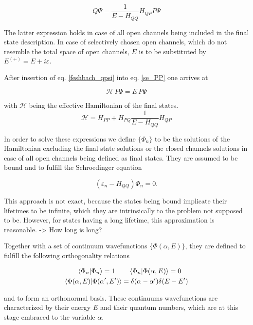 \begin{equation}
  Q \Psi = \frac{1}{E-H_{QQ}} H_{QP} P \Psi \label{feshbach_qpsi}
\end{equation}

The latter expression holds in case of all open channels being included
in the final state description.
In case of selectively chosen open channels, which do not resemble the total
space of open channels,
$E$ is to be substituted by $E^{(+)}=E + i\varepsilon$.

After insertion of eq. \ref{feshbach_qpsi} into eq. \ref{se_PP} one arrives at

\begin{equation}
  \mathscr{H} \,P \Psi = E \,P \Psi \label{se_ppsi}
\end{equation}

with $\mathscr{H}$ being the effective Hamiltonian of the final states.
\begin{equation}
  \mathscr{H} = H_{PP} + H_{PQ} \frac{1}{E-H_{QQ}} H_{QP}
\end{equation}

In order to solve these expressions we define $\{\Phi_n\}$ to be the solutions
of the Hamiltonian excluding the final state solutions or the closed channels
solutions in case of all open channels being defined as final states.
They are assumed to be bound and to fulfill the
Schroedinger equation

\begin{equation}
  (\varepsilon_n - H_{QQ}) \Phi_n = 0 .
\end{equation}

This approach is not exact, because the states being bound implicate
their lifetimes to be infinite, which they are intrinsically
to the problem not supposed to be. However, for states having a long lifetime,
this approximation is reasonable. -> How long is long?

Together with a set of continuum wavefunctions $\{\Phi(\alpha,E)\}$, they are
defined to fulfill the following orthogonality relations

\begin{align}
  \braket{\Phi_n|\Phi_n} = 1 \quad  & \quad \braket{\Phi_n|\Phi(\alpha,E)} = 0\\
  \braket{\Phi(\alpha,E)|\Phi(\alpha',E')} & = \delta(\alpha-\alpha') \delta(E-E')
\end{align}

and to form an orthonormal basis. These continuums wavefunctions are characterized
by their energy $E$ and their quantum numbers, which are at this stage embraced
to the variable $\alpha$.

